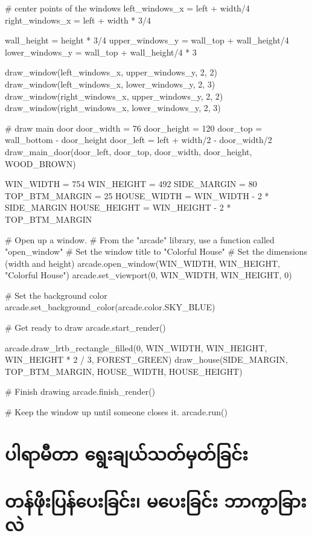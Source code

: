 \begin{py}
    # center points of the windows
    left_windows_x = left + width/4
    right_windows_x = left + width * 3/4

    wall_height = height * 3/4
    upper_windows_y = wall_top + wall_height/4
    lower_windows_y = wall_top + wall_height/4 * 3

    draw_window(left_windows_x, upper_windows_y, 2, 2)
    draw_window(left_windows_x, lower_windows_y, 2, 3)
    draw_window(right_windows_x, upper_windows_y, 2, 2)
    draw_window(right_windows_x, lower_windows_y, 2, 3)

    # draw main door
    door_width = 76
    door_height = 120
    door_top = wall_bottom - door_height
    door_left = left + width/2 - door_width/2
    draw_main_door(door_left, door_top,
                   door_width, door_height,
                   WOOD_BROWN)


WIN_WIDTH = 754
WIN_HEIGHT = 492
SIDE_MARGIN = 80
TOP_BTM_MARGIN = 25
HOUSE_WIDTH = WIN_WIDTH - 2 * SIDE_MARGIN
HOUSE_HEIGHT = WIN_HEIGHT - 2 * TOP_BTM_MARGIN

# Open up a window.
# From the "arcade" library, use a function called "open_window"
# Set the window title to "Colorful House"
# Set the dimensions (width and height)
arcade.open_window(WIN_WIDTH, WIN_HEIGHT, "Colorful House")
arcade.set_viewport(0, WIN_WIDTH, WIN_HEIGHT, 0)

# Set the background color
arcade.set_background_color(arcade.color.SKY_BLUE)

# Get ready to draw
arcade.start_render()

arcade.draw_lrtb_rectangle_filled(0, WIN_WIDTH,
                                  WIN_HEIGHT, WIN_HEIGHT * 2 / 3,
                                  FOREST_GREEN)
draw_house(SIDE_MARGIN, TOP_BTM_MARGIN, HOUSE_WIDTH, HOUSE_HEIGHT)


# Finish drawing
arcade.finish_render()

# Keep the window up until someone closes it.
arcade.run()

\end{py}
%


\section{ပါရာမီတာ ရွေးချယ်သတ်မှတ်ခြင်း}

\section{တန်ဖိုးပြန်ပေးခြင်း၊ မပေးခြင်း ဘာကွာခြားလဲ}

